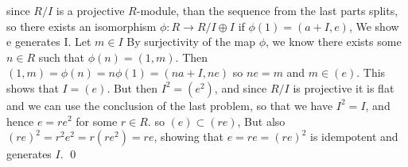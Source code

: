 \documentclass{article}
\begin{document}
\newline
\newline
since $R/I$ is a projective $R$-module, than the sequence from the last parts splits, so there exists an isomorphism $\phi: R \rightarrow R/I \oplus I$
if $\phi(1) = (a+I,e)$, We show e generates I. Let $m\in I$ By surjectivity of the map $\phi$, we know there exists some $n\in R$ such that
$\phi(n)= (1,m)$.  Then 
$(1,m)=\phi(n)=n\phi(1)=(na+I,ne)$ so $ne=m$ and $m\in (e)$. This shows that $I = (e)$.  But then $I^2 = (e^2)$, and since $R/I$ is projective it is flat and we can use the conclusion of the last problem, so that we have $I^2=I$, and hence $e=re^2$ for some $r\in R$.
so $(e)\subset(re)$, But also $(re)^2 = r^2e^2=r(re^2)=re$, showing that $e=re=(re)^2$ is idempotent and generates $I$. \qed
\end{document}
